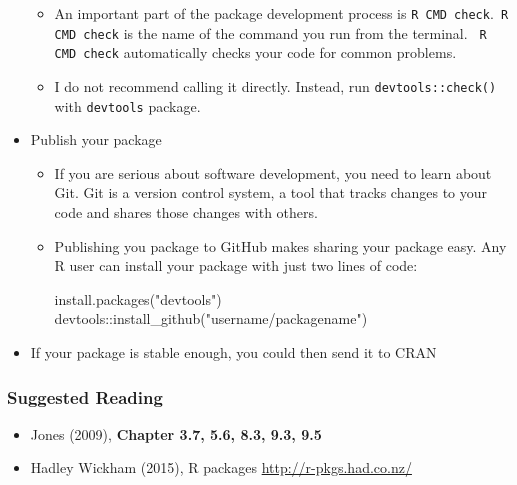\documentclass[10pt]{beamer}
\begin{document}
\begin{frame}
\begin{itemize}
    \begin{itemize}
    \item An important part of the package development process is \texttt{R CMD
        check}.\texttt{ R CMD check} is the name of the command you run from the
      terminal. \texttt{ R CMD check} automatically checks your code for common problems.

    \item I do not recommend calling it directly. Instead, run \texttt{devtools::check()}
    with \texttt{devtools} package.

    \end{itemize}
    \newpage
  \item Publish your package

    \begin{itemize}
    \item If you are serious about software development, you need to learn about Git. Git
      is a version control system, a tool that tracks changes to your code and shares
      those changes with others.

    \item Publishing you package to GitHub makes sharing your package easy. Any R user can
      install your package with just two lines of code:

\begin{verbatim*}
install.packages("devtools")
devtools::install_github("username/packagename")
\end{verbatim*}
    \end{itemize}

    \item If your package is stable enough, you could then send it to CRAN
  \end{itemize}
\end{frame}

\begin{frame}
  \frametitle{Suggested Reading}

  \begin{itemize}
  \item Jones (2009), \textbf{Chapter 3.7, 5.6, 8.3, 9.3, 9.5}
  \item Hadley Wickham (2015), R packages \url{http://r-pkgs.had.co.nz/}



  \end{itemize}

\end{frame}
\end{document}
